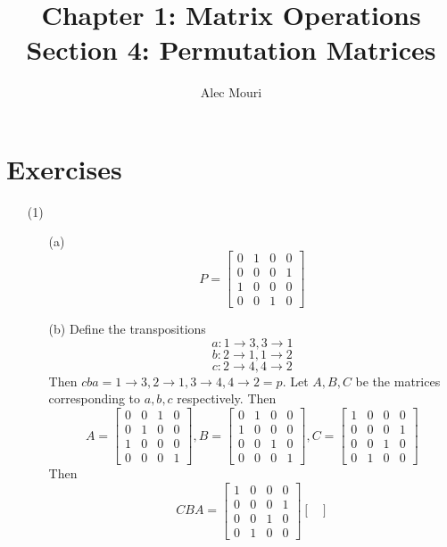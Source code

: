 \documentclass[12pt]{article}
\begin{document}
\title{Chapter 1: Matrix Operations \\ Section 4: Permutation Matrices}
\author{Alec Mouri}

\maketitle
\section*{Exercises}
\begin{itemize}
\item[(1)]
\begin{itemize}
\item[(a)]
$$P = \begin{bmatrix}
0 & 1 & 0 & 0 \\
0 & 0 & 0 & 1 \\
1 & 0 & 0 & 0 \\
0 & 0 & 1 & 0
\end{bmatrix}$$
\item[(b)]
Define the transpositions 
$$a: 1 \rightarrow 3, 3 \rightarrow 1$$
$$b: 2 \rightarrow 1, 1 \rightarrow 2$$
$$c: 2 \rightarrow 4, 4 \rightarrow 2$$
Then $cba = 1 \rightarrow 3, 2 \rightarrow 1, 3 \rightarrow 4, 4 \rightarrow 2 = p$. Let $A, B, C$ be the matrices corresponding to $a, b, c$ respectively. Then
$$A = \begin{bmatrix}
0 & 0 & 1 & 0 \\
0 & 1 & 0 & 0 \\
1 & 0 & 0 & 0 \\
0 & 0 & 0 & 1
\end{bmatrix}, B = \begin{bmatrix}
0 & 1 & 0 & 0 \\
1 & 0 & 0 & 0 \\
0 & 0 & 1 & 0 \\
0 & 0 & 0 & 1
\end{bmatrix}, C = \begin{bmatrix}
1 & 0 & 0 & 0 \\
0 & 0 & 0 & 1 \\
0 & 0 & 1 & 0 \\
0 & 1 & 0 & 0
\end{bmatrix}$$
Then
$$CBA = \begin{bmatrix}
1 & 0 & 0 & 0 \\
0 & 0 & 0 & 1 \\
0 & 0 & 1 & 0 \\
0 & 1 & 0 & 0
\end{bmatrix}\begin{bmatrix}

\end{bmatrix}$$
\end{itemize}
\end{itemize}
\end{document}
